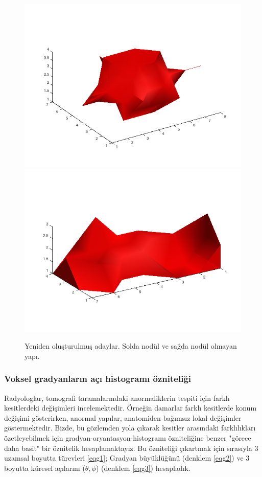 \documentclass[conference]{IEEEtran}
\begin{document}
\begin{figure}[tb]
\centering
\includegraphics[scale=0.2]{figs/ex_nod.png}
\includegraphics[scale=0.2]{figs/ex_ves.png}
\caption{Yeniden oluşturulmuş adaylar. Solda nodül ve sağda nodül olmayan yapı.}
\label{fig3}
\end{figure}

\subsubsection{Voksel gradyanların açı histogramı özniteliği}
Radyologlar, tomografi taramalarındaki anormaliklerin tespiti için farklı kesitlerdeki değişimleri incelemektedir. Örneğin damarlar farklı kesitlerde konum değişimi gösterirken, anormal yapılar, anatomiden bağımsız lokal değişimler göstermektedir. Bizde, bu gözlemden yola çıkarak kesitler arasındaki farklılıkları özetleyebilmek için gradyan-oryantasyon-histogramı \cite{dalal2005} özniteliğine benzer "görece daha basit" bir öznitelik hesaplamaktayız. Bu özniteliği çıkartmak için sırasıyla 3 uzamsal boyutta türevleri \ref{eqg1};
Gradyan büyüklüğünü (denklem \ref{eqg2}) ve 3 boyutta küresel açılarını ($\theta, \phi$) (denklem \ref{eqg3}) hesapladık.
\end{document}
